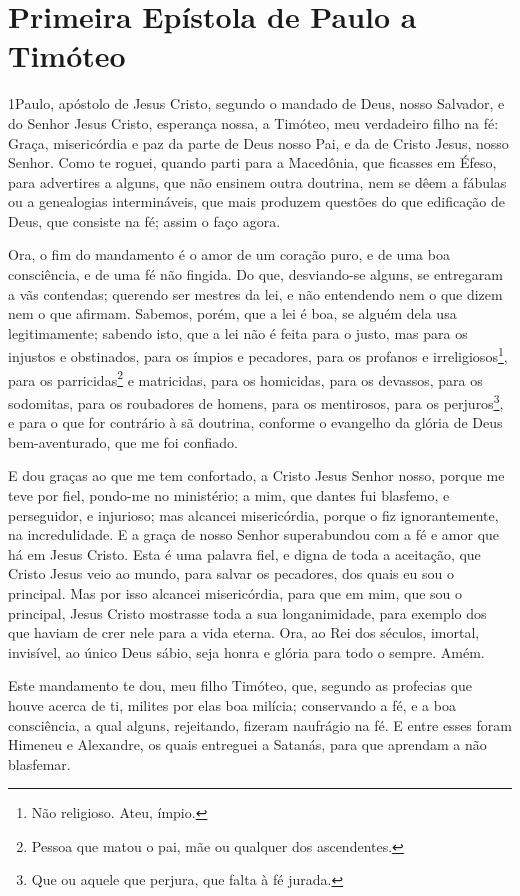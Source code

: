 \thispagestyle{empty}
\chapter*{Primeira Epístola de Paulo a Timóteo}

\lettrine{1} Paulo, apóstolo de Jesus Cristo, segundo o
mandado de Deus, nosso Salvador, e do Senhor Jesus Cristo, esperança
nossa, a Timóteo, meu verdadeiro filho na fé: Graça,
misericórdia e paz da parte de Deus nosso Pai, e da de Cristo Jesus,
nosso Senhor. Como te roguei, quando parti para a Macedônia, que
ficasses em Éfeso, para advertires a alguns, que não ensinem outra
doutrina, nem se dêem a fábulas ou a genealogias intermináveis,
que mais produzem questões do que edificação de Deus, que consiste
na fé; assim o faço agora.

Ora, o fim do mandamento é o amor de um coração puro, e de uma boa
consciência, e de uma fé não fingida. Do que, desviando-se
alguns, se entregaram a vãs contendas; querendo ser mestres da
lei, e não entendendo nem o que dizem nem o que afirmam.
Sabemos, porém, que a lei é boa, se alguém dela usa
legitimamente; sabendo isto, que a lei não é feita para o justo,
mas para os injustos e obstinados, para os ímpios e pecadores, para
os profanos e irreligiosos\footnote{Não religioso. Ateu, ímpio.},
para os parricidas\footnote{Pessoa que matou o pai, mãe ou qualquer
dos ascendentes.} e matricidas, para os homicidas, para os
devassos, para os sodomitas, para os roubadores de homens, para os
mentirosos, para os perjuros\footnote{Que ou aquele que perjura, que
falta à fé jurada.}, e para o que for contrário à sã doutrina,
conforme o evangelho da glória de Deus bem-aventurado, que me
foi confiado.

E dou graças ao que me tem confortado, a Cristo Jesus Senhor
nosso, porque me teve por fiel, pondo-me no ministério; a
mim, que dantes fui blasfemo, e perseguidor, e injurioso; mas
alcancei misericórdia, porque o fiz ignorantemente, na
incredulidade. E a graça de nosso Senhor superabundou com a
fé e amor que há em Jesus Cristo. Esta é uma palavra fiel, e
digna de toda a aceitação, que Cristo Jesus veio ao mundo, para
salvar os pecadores, dos quais eu sou o principal. Mas por
isso alcancei misericórdia, para que em mim, que sou o principal,
Jesus Cristo mostrasse toda a sua longanimidade, para exemplo dos
que haviam de crer nele para a vida eterna. Ora, ao Rei dos
séculos, imortal, invisível, ao único Deus sábio, seja honra e
glória para todo o sempre. Amém.

Este mandamento te dou, meu filho Timóteo, que, segundo as
profecias que houve acerca de ti, milites por elas boa milícia;
conservando a fé, e a boa consciência, a qual alguns,
rejeitando, fizeram naufrágio na fé. E entre esses foram
Himeneu e Alexandre, os quais entreguei a Satanás, para que aprendam
a não blasfemar.

